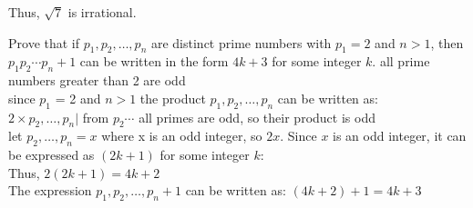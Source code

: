 \documentclass{article}
\begin{document}
Thus, \( \sqrt{7} \) is irrational.

	\quad
	
	Prove that if $p_1, p_2, \dots, p_n$ are distinct prime numbers with $p_1 = 2$ and $n > 1$, then $p_1 p_2 \cdots p_n + 1$ can be written in the form $4k + 3$ for some integer $k$.
	\subitem  all prime numbers greater than 2 are odd \\ 
	since $p_1$ = 2 and $n>1$ the product $p_1, p_2, \dots, p_n$ can be written as:\\
	$2 \times p_2, \dots, p_n | $ from $p_2 \cdots$ all primes are odd, so their product is odd\\ 
	let $p_2, \dots, p_n = x$ where x is an odd integer, so $2x$.
	Since $x$ is an odd integer, it can be expressed as $(2k+1)$ for some integer $k$:\\
	Thus, $2(2k+1) = 4k+2$ \\ 
	The expression $p_1, p_2, \dots, p_n + 1$ can be written as: $(4k+2)+ 1 = 4k + 3$ \\
	
	
	
\end{document}
